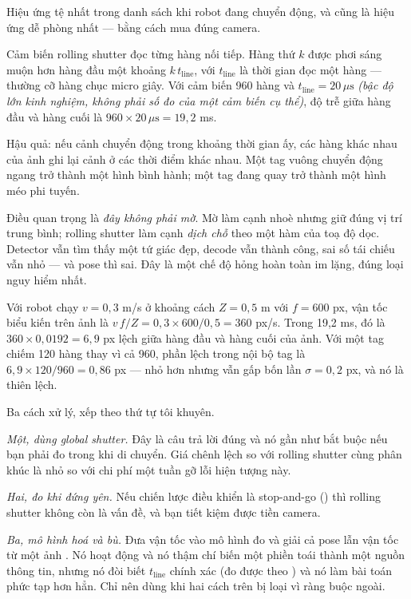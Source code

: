 \documentclass[../../marker.tex]{subfiles}
\begin{document}
Hiệu ứng tệ nhất trong danh sách khi robot đang chuyển động, và cũng là hiệu ứng dễ phòng nhất --- bằng cách mua đúng camera.

Cảm biến rolling shutter đọc từng hàng nối tiếp. Hàng thứ \(k\) được phơi sáng muộn hơn hàng đầu một khoảng \(k\,t_{\text{line}}\), với \(t_{\text{line}}\) là thời gian đọc một hàng --- thường cỡ hàng chục micro giây. Với cảm biến 960 hàng và \(t_{\text{line}} = 20\,\mu\text{s}\) \emph{(bậc độ lớn kinh nghiệm, không phải số đo của một cảm biến cụ thể)}, độ trễ giữa hàng đầu và hàng cuối là \(960 \times 20\,\mu\text{s} = 19{,}2\) ms.

Hậu quả: nếu cảnh chuyển động trong khoảng thời gian ấy, các hàng khác nhau của ảnh ghi lại cảnh ở các thời điểm khác nhau. Một tag vuông chuyển động ngang trở thành một hình bình hành; một tag đang quay trở thành một hình méo phi tuyến.

Điều quan trọng là \emph{đây không phải mờ}. Mờ làm cạnh nhoè nhưng giữ đúng vị trí trung bình; rolling shutter làm cạnh \emph{dịch chỗ} theo một hàm của toạ độ dọc. Detector vẫn tìm thấy một tứ giác đẹp, decode vẫn thành công, sai số tái chiếu vẫn nhỏ --- và pose thì sai. Đây là một chế độ hỏng hoàn toàn im lặng, đúng loại nguy hiểm nhất.

Với robot chạy \(v = 0{,}3\) m/s ở khoảng cách \(Z = 0{,}5\) m với \(f = 600\) px, vận tốc biểu kiến trên ảnh là \(v\,f/Z = 0{,}3 \times 600/0{,}5 = 360\) px/s. Trong 19,2 ms, đó là \(360 \times 0{,}0192 = 6{,}9\) px lệch giữa hàng đầu và hàng cuối của ảnh. Với một tag chiếm 120 hàng thay vì cả 960, phần lệch trong nội bộ tag là \(6{,}9 \times 120/960 = 0{,}86\) px --- nhỏ hơn nhưng vẫn gấp bốn lần \(\sigma = 0{,}2\) px, và nó là thiên lệch.

Ba cách xử lý, xếp theo thứ tự tôi khuyên.

\emph{Một, dùng global shutter.} Đây là câu trả lời đúng và nó gần như bắt buộc nếu bạn phải đo trong khi di chuyển. Giá chênh lệch so với rolling shutter cùng phân khúc là nhỏ so với chi phí một tuần gỡ lỗi hiện tượng này.

\emph{Hai, đo khi đứng yên.} Nếu chiến lược điều khiển là stop-and-go () thì rolling shutter không còn là vấn đề, và bạn tiết kiệm được tiền camera.

\emph{Ba, mô hình hoá và bù.} Đưa vận tốc vào mô hình đo và giải cả pose lẫn vận tốc từ một ảnh \cite{ait2006rollingshutter}. Nó hoạt động và nó thậm chí biến một phiền toái thành một nguồn thông tin, nhưng nó đòi biết \(t_{\text{line}}\) chính xác (đo được theo \cite{oth2013rollingshutter}) và nó làm bài toán phức tạp hơn hẳn. Chỉ nên dùng khi hai cách trên bị loại vì ràng buộc ngoài.
\end{document}
